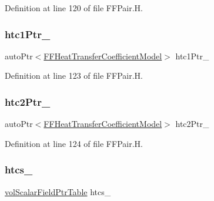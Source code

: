 Definition at line 120 of file F\+F\+Pair.\+H.

\mbox{\label{classFoam_1_1FFPair_a979ece87b5bb1a7c5eac17835ba09d8a}} 
\subsubsection{\texorpdfstring{htc1\+Ptr\+\_\+}{htc1Ptr\_}}
{\footnotesize\ttfamily auto\+Ptr$<$\hyperlink{classFoam_1_1FFHeatTransferCoefficientModel}{F\+F\+Heat\+Transfer\+Coefficient\+Model}$>$ htc1\+Ptr\+\_\+\hspace{0.3cm}{\ttfamily [protected]}}



Definition at line 123 of file F\+F\+Pair.\+H.

\mbox{\label{classFoam_1_1FFPair_a3229083e4ddb7541c50f509732defb95}} 
\subsubsection{\texorpdfstring{htc2\+Ptr\+\_\+}{htc2Ptr\_}}
{\footnotesize\ttfamily auto\+Ptr$<$\hyperlink{classFoam_1_1FFHeatTransferCoefficientModel}{F\+F\+Heat\+Transfer\+Coefficient\+Model}$>$ htc2\+Ptr\+\_\+\hspace{0.3cm}{\ttfamily [protected]}}



Definition at line 124 of file F\+F\+Pair.\+H.

\mbox{\label{classFoam_1_1FFPair_a1fbdcaf01d7a27bcb2ee93d15c3f8992}} 
\subsubsection{\texorpdfstring{htcs\+\_\+}{htcs\_}}
{\footnotesize\ttfamily \hyperlink{classFoam_1_1FFPair_a0848121d1a9fe5a3d3471760ef9de2fe}{vol\+Scalar\+Field\+Ptr\+Table} htcs\+\_\+\hspace{0.3cm}{\ttfamily [protected]}}



